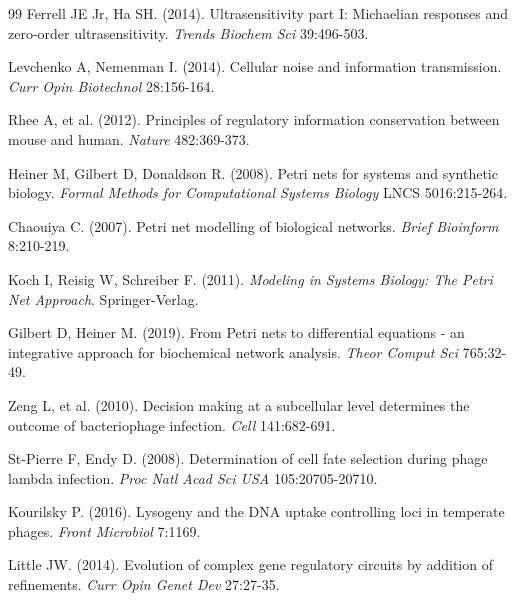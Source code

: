 \documentclass[10pt,twocolumn]{article}
\begin{document}
\begin{thebibliography}{99}
Ferrell JE Jr, Ha SH. (2014). Ultrasensitivity part I: Michaelian responses and zero-order ultrasensitivity. \textit{Trends Biochem Sci} 39:496-503.

Levchenko A, Nemenman I. (2014). Cellular noise and information transmission. \textit{Curr Opin Biotechnol} 28:156-164.

Rhee A, et al. (2012). Principles of regulatory information conservation between mouse and human. \textit{Nature} 482:369-373.

Heiner M, Gilbert D, Donaldson R. (2008). Petri nets for systems and synthetic biology. \textit{Formal Methods for Computational Systems Biology} LNCS 5016:215-264.

Chaouiya C. (2007). Petri net modelling of biological networks. \textit{Brief Bioinform} 8:210-219.

Koch I, Reisig W, Schreiber F. (2011). \textit{Modeling in Systems Biology: The Petri Net Approach}. Springer-Verlag.

Gilbert D, Heiner M. (2019). From Petri nets to differential equations - an integrative approach for biochemical network analysis. \textit{Theor Comput Sci} 765:32-49.

Zeng L, et al. (2010). Decision making at a subcellular level determines the outcome of bacteriophage infection. \textit{Cell} 141:682-691.

St-Pierre F, Endy D. (2008). Determination of cell fate selection during phage lambda infection. \textit{Proc Natl Acad Sci USA} 105:20705-20710.

Kourilsky P. (2016). Lysogeny and the DNA uptake controlling loci in temperate phages. \textit{Front Microbiol} 7:1169.

Little JW. (2014). Evolution of complex gene regulatory circuits by addition of refinements. \textit{Curr Opin Genet Dev} 27:27-35.

\end{thebibliography}
\end{document}
